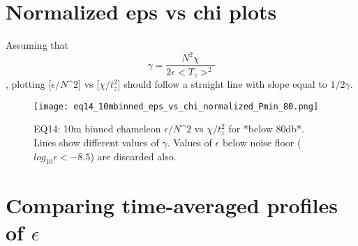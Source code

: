 \documentclass[11pt]{article}
\begin{document}
\clearpage
\section{Normalized eps vs chi plots}

Assuming that
\begin{equation}
\gamma=\frac{N^2 \chi}{2\epsilon<T_z>^2}
\end{equation}
, plotting [$\epsilon/N\^2$] vs [$\chi/t_{z}^{2}$] should follow a straight line with slope equal to $1/2\gamma$.



\begin{figure}[htbp]
\texttt{[image: eq14\_10mbinned\_eps\_vs\_chi\_normalized\_Pmin\_80.png]}
\caption{EQ14: 10m binned  chameleon $\epsilon/N\^2$ vs $\chi/t_{z}^{2}$ for *below 80db*. Lines show different values of $\gamma$. Values of $\epsilon$ below noise floor ($log_{10}\epsilon<-8.5$) are discarded also.}
\label{}
\end{figure}




\clearpage
\section{Comparing time-averaged profiles of $\epsilon$}

%
%
%
\end{document}
